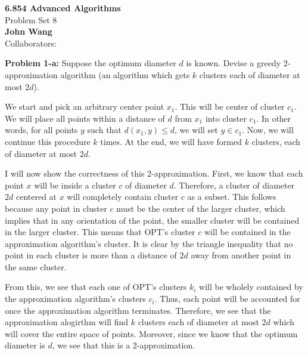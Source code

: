 \documentclass[psamsfonts]{amsart}
\newenvironment{sol}{\vspace{0.25cm}{\large \bfseries Solution:}}{\qedsymbol}
\newenvironment{prob}[1]{\begin{framed}{\large \bfseries Problem #1:}}{\end{framed}}
\newcommand{\makenewtitle}{
    \begin{center}
    {\huge \bfseries 6.854 Advanced Algorithms} \\
    Problem Set 8\\
    \vspace{0.25cm}
    {\bfseries John Wang} \\
    Collaborators:  
    \end{center}
    \vspace{0.5cm}
}
\begin{document}
\makenewtitle

\begin{prob}{1-a}
Suppose the optimum diameter $d$ is known. Devise a greedy 2-approximation algorithm (an algorithm which gets $k$ clusters each of diameter at most $2d$). 
\end{prob}
\begin{sol}
We start and pick an arbitrary center point $x_1$. This will be center of cluster $c_1$. We will place all points within a distance of $d$ from $x_1$ into cluster $c_1$. In other words, for all points $y$ such that $d(x_1, y) \leq d$, we will set $y \in c_1$. Now, we will continue this procedure $k$ times. At the end, we will have formed $k$ clusters, each of diameter at most $2d$. 

I will now show the correctness of this 2-approximation. First, we know that each point $x$ will be inside a cluster $c$ of diameter $d$. Therefore, a cluster of diameter $2d$ centered at $x$ will completely contain cluster $c$ as a subset. This follows because any point in cluster $c$ must be the center of the larger cluster, which implies that in any orientation of the point, the smaller cluster will be contained in the larger cluster. This means that OPT's cluster $c$ will be contained in the approximation algorithm's cluster. It is clear by the triangle inequality that no point in each cluster is more than a distance of $2d$ away from another point in the same cluster.

From this, we see that each one of OPT's clusters $k_i$ will be wholely contained by the approximation algorithm's clusters $c_i$. Thus, each point will be accounted for once the approximation algorithm terminates. Therefore, we see that the approximation alogirthm will find $k$ clusters each of diameter at most $2d$ which will cover the entire space of points. Moreover, since we know that the optimum diameter is $d$, we see that this is a 2-approximation.
\end{sol}
\end{document}
